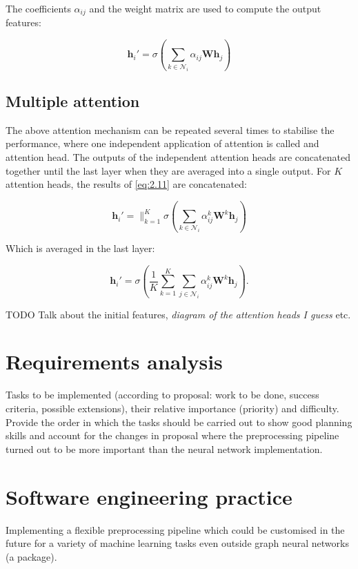 The coefficients $\alpha_{ij}$ and the weight matrix are used to compute the output features:

\begin{equation}
    \mathbf{h}_i' = \sigma(\sum\limits_{k \in \mathcal{N}_i} \alpha_{ij}\mathbf{W}\mathbf{h}_j)\label{eq:2.11}
\end{equation}

\subsection{Multiple attention}
The above attention mechanism can be repeated several times to stabilise the performance, where one independent application of attention is called and attention head. The outputs of the independent attention heads are concatenated together until the last layer when they are averaged into a single output. For $K$ attention heads, the results of \eqref{eq:2.11} are concatenated:

\begin{equation}
    \mathbf{h}_i' = \big\|_{k=1}^{K} \sigma(\sum\limits_{k \in \mathcal{N}_i} \alpha_{ij}^k\mathbf{W}^k\mathbf{h}_j)
\end{equation}

Which is averaged in the last layer:

\begin{equation}
    \mathbf{h}_i' = \sigma(\frac{1}{K}\sum\limits_{k=1}^K\sum\limits_{j \in \mathcal{N}_i} \alpha_{ij}^k\mathbf{W}^k\mathbf{h}_j).
\end{equation}

TODO Talk about the initial features, \textit{diagram of the attention heads I guess} etc.


\section{Requirements analysis}

Tasks to be implemented (according to proposal: work to be done, success criteria, possible extensions), their relative importance (priority) and difficulty. Provide the order in which the tasks should be carried out to show good planning skills and account for the changes in proposal where the preprocessing pipeline turned out to be more important than the neural network implementation.

\section{Software engineering practice}
Implementing a flexible preprocessing pipeline which could be customised in the future for a variety of machine learning tasks even outside graph neural networks (a package).

